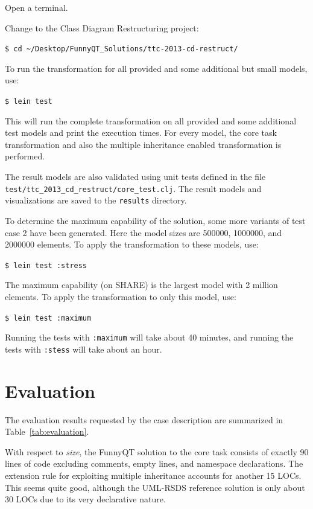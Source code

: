 \documentclass[11pt]{article}
\begin{document}
\begin{compactenum}
\item Open a terminal.
\item Change to the Class Diagram Restructuring project:

  \verb|$ cd ~/Desktop/FunnyQT_Solutions/ttc-2013-cd-restruct/|
\item To run the transformation for all provided and some additional but small
  models, use:

  \verb|$ lein test|

  This will run the complete transformation on all provided and some additional
  test models and print the execution times.  For every model, the core task
  transformation and also the multiple inheritance enabled transformation is
  performed.

  \begin{sloppypar}
    The result models are also validated using unit tests defined in the file
    \verb|test/ttc_2013_cd_restruct/core_test.clj|.  The result models and
    visualizations are saved to the \verb|results| directory.
  \end{sloppypar}
\item To determine the maximum capability of the solution, some more variants
  of test case 2 have been generated.  Here the model sizes are 500000,
  1000000, and 2000000 elements.  To apply the transformation to these models,
  use:

  \verb|$ lein test :stress|

  The maximum capability (on SHARE) is the largest model with 2 million
  elements.  To apply the transformation to only this model, use:

  \verb|$ lein test :maximum|

  Running the tests with \verb|:maximum| will take about 40 minutes, and
  running the tests with \verb|:stess| will take about an hour.
\end{compactenum}


\section{Evaluation}
\label{sec:evaluation}

The evaluation results requested by the case description
\cite{cdrestructcasedesc} are summarized in Table~\ref{tab:evaluation}.

With respect to \emph{size}, the FunnyQT solution to the core task consists of
exactly 90 lines of code excluding comments, empty lines, and namespace
declarations.  The extension rule for exploiting multiple inheritance accounts
for another 15 LOCs.  This seems quite good, although the UML-RSDS reference
solution is only about 30 LOCs due to its very declarative nature.
\end{document}
